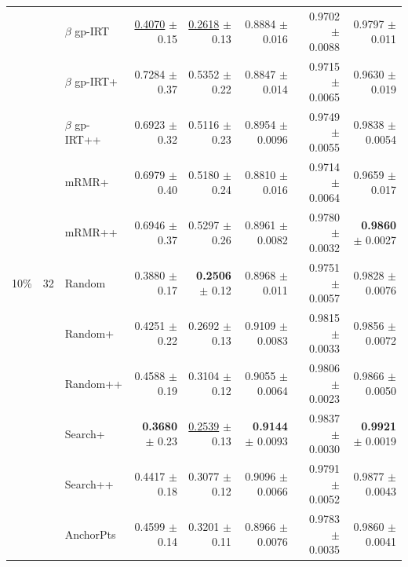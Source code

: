 \begin{longtable}{llp{}rrrrr}
 &  & $\beta$ gp-IRT & \underline{0.4070} {\scriptsize $\pm$ 0.15} & \underline{0.2618} {\scriptsize $\pm$ 0.13} & 0.8884 {\scriptsize $\pm$ 0.016} & 0.9702 {\scriptsize $\pm$ 0.0088} & 0.9797 {\scriptsize $\pm$ 0.011} \\
 &  & $\beta$ gp-IRT+ & 0.7284 {\scriptsize $\pm$ 0.37} & 0.5352 {\scriptsize $\pm$ 0.22} & 0.8847 {\scriptsize $\pm$ 0.014} & 0.9715 {\scriptsize $\pm$ 0.0065} & 0.9630 {\scriptsize $\pm$ 0.019} \\
 &  & $\beta$ gp-IRT++ & 0.6923 {\scriptsize $\pm$ 0.32} & 0.5116 {\scriptsize $\pm$ 0.23} & 0.8954 {\scriptsize $\pm$ 0.0096} & 0.9749 {\scriptsize $\pm$ 0.0055} & 0.9838 {\scriptsize $\pm$ 0.0054} \\
 &  & mRMR+ & 0.6979 {\scriptsize $\pm$ 0.40} & 0.5180 {\scriptsize $\pm$ 0.24} & 0.8810 {\scriptsize $\pm$ 0.016} & 0.9714 {\scriptsize $\pm$ 0.0064} & 0.9659 {\scriptsize $\pm$ 0.017} \\
 &  & mRMR++ & 0.6946 {\scriptsize $\pm$ 0.37} & 0.5297 {\scriptsize $\pm$ 0.26} & 0.8961 {\scriptsize $\pm$ 0.0082} & 0.9780 {\scriptsize $\pm$ 0.0032} & \textbf{0.9860} {\scriptsize $\pm$ 0.0027} \\
\midrule
10\% & 32 & Random & 0.3880 {\scriptsize $\pm$ 0.17} & \textbf{0.2506} {\scriptsize $\pm$ 0.12} & 0.8968 {\scriptsize $\pm$ 0.011} & 0.9751 {\scriptsize $\pm$ 0.0057} & 0.9828 {\scriptsize $\pm$ 0.0076} \\
 &  & Random+ & 0.4251 {\scriptsize $\pm$ 0.22} & 0.2692 {\scriptsize $\pm$ 0.13} & 0.9109 {\scriptsize $\pm$ 0.0083} & 0.9815 {\scriptsize $\pm$ 0.0033} & 0.9856 {\scriptsize $\pm$ 0.0072} \\
 &  & Random++ & 0.4588 {\scriptsize $\pm$ 0.19} & 0.3104 {\scriptsize $\pm$ 0.12} & 0.9055 {\scriptsize $\pm$ 0.0064} & 0.9806 {\scriptsize $\pm$ 0.0023} & 0.9866 {\scriptsize $\pm$ 0.0050} \\
 &  & Search+ & \textbf{0.3680} {\scriptsize $\pm$ 0.23} & \underline{0.2539} {\scriptsize $\pm$ 0.13} & \textbf{0.9144} {\scriptsize $\pm$ 0.0093} & 0.9837 {\scriptsize $\pm$ 0.0030} & \textbf{0.9921} {\scriptsize $\pm$ 0.0019} \\
 &  & Search++ & 0.4417 {\scriptsize $\pm$ 0.18} & 0.3077 {\scriptsize $\pm$ 0.12} & 0.9096 {\scriptsize $\pm$ 0.0066} & 0.9791 {\scriptsize $\pm$ 0.0052} & 0.9877 {\scriptsize $\pm$ 0.0043} \\
 &  & AnchorPts & 0.4599 {\scriptsize $\pm$ 0.14} & 0.3201 {\scriptsize $\pm$ 0.11} & 0.8966 {\scriptsize $\pm$ 0.0076} & 0.9783 {\scriptsize $\pm$ 0.0035} & 0.9860 {\scriptsize $\pm$ 0.0041} \\

\end{longtable}
